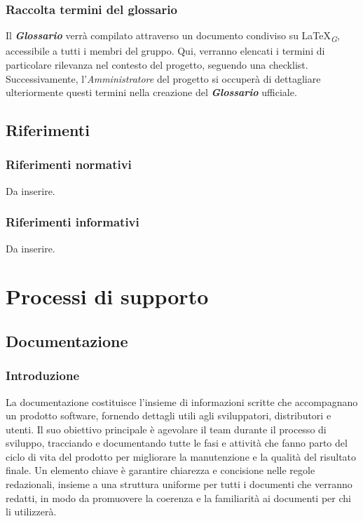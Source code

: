 \documentclass{article}
\begin{document}
\subsubsection{Raccolta termini del glossario}
Il \textbf{\textit{Glossario}} verrà compilato attraverso un documento condiviso su \LaTeX \textsubscript{\textit{G}}, accessibile a tutti i membri del gruppo. Qui, verranno elencati i termini di particolare rilevanza nel contesto del progetto, seguendo una checklist. Successivamente, l'\textit{Amministratore} del progetto si occuperà di dettagliare ulteriormente questi termini nella creazione del \textbf{\textit{Glossario}} ufficiale.

\subsection{Riferimenti}
\subsubsection{Riferimenti normativi}
Da inserire.
\subsubsection{Riferimenti informativi}
Da inserire.

\section{Processi di supporto}

\subsection{Documentazione}
    
    \subsubsection{Introduzione}
    La documentazione costituisce l'insieme di informazioni scritte che accompagnano un prodotto software, fornendo dettagli utili agli sviluppatori, distributori e utenti. Il suo obiettivo principale è agevolare il team durante il processo di sviluppo, tracciando e documentando tutte le fasi e attività che fanno parto del ciclo di vita del prodotto per migliorare la manutenzione e la qualità del risultato finale. Un elemento chiave è garantire chiarezza e concisione nelle regole redazionali, insieme a una struttura uniforme per tutti i documenti che verranno redatti, in modo da promuovere la coerenza e la familiarità ai documenti per chi li utilizzerà. 
    
\end{document}
